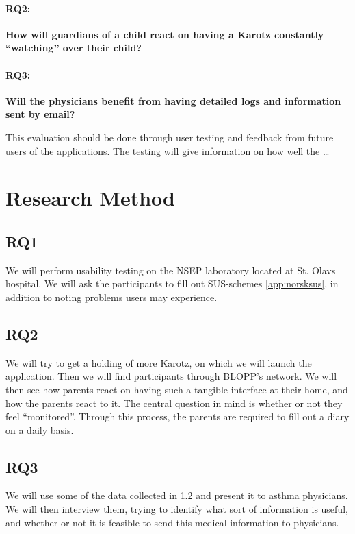 \paragraph{RQ2:}
\textbf{How will guardians of a child react on having a Karotz constantly ``watching'' over their child?}


\paragraph{RQ3:}
\textbf{Will the physicians benefit from having detailed logs and information sent by email?}

This evaluation should be done through user testing and feedback from future users of the applications. The testing will give information on how well the 
\ldots

\section{Research Method}
\label{sec:researchmethod}

\subsection{RQ1}
\label{sec: RQ1-methodology}
We will perform usability testing on the NSEP laboratory located at St. Olavs hospital. We will ask the participants to fill out SUS-schemes \ref{app:norsksus}, in addition to noting problems users may experience. 


\subsection{RQ2}
\label{sec: RQ2-methodology}
We will try to get a holding of more Karotz, on which we will launch the application. Then we will find participants through BLOPP's network. We will then see how parents react on having such a tangible interface at their home, and how the parents react to it. The central question in mind is whether or not they feel ``monitored''. Through this process, the parents are required to fill out a diary on a daily basis. 


\subsection{RQ3}
\label{sec: RQ3-methodology}
We will use some of the data collected in \ref{sec: RQ2-methodology} and present it to asthma physicians. We will then interview them, trying to identify what sort of information is useful, and whether or not it is feasible to send this medical information to physicians.    



